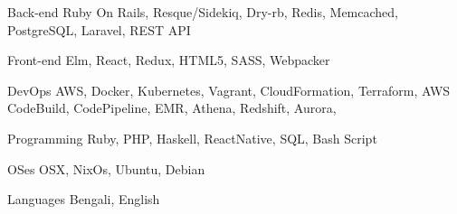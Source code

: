 

\begin{cvskills}

  \cvskill
    {Back-end} %
    {Ruby On Rails, Resque/Sidekiq, Dry-rb, Redis, Memcached, PostgreSQL, Laravel, REST API} %

  \cvskill
    {Front-end} %
    {Elm, React, Redux, HTML5, SASS, Webpacker} %

  \cvskill
    {DevOps} %
    {AWS, Docker, Kubernetes, Vagrant, CloudFormation, Terraform, AWS CodeBuild, CodePipeline, EMR, Athena, Redshift, Aurora, } %

  \cvskill
    {Programming} %
    {Ruby, PHP, Haskell, ReactNative, SQL, Bash Script} %

  \cvskill
    {OSes} %
    {OSX, NixOs, Ubuntu, Debian} %

  \cvskill
    {Languages} %
    {Bengali, English} %

\end{cvskills}
